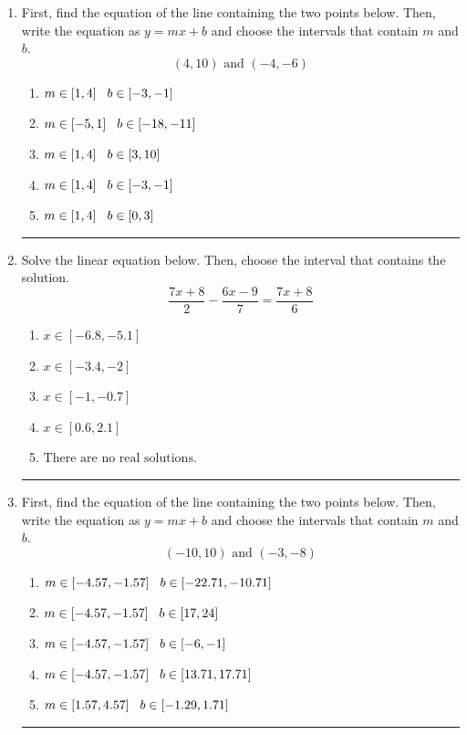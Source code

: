 \documentclass[14pt]{extbook}
\newcommand{\litem}[1]{\item#1\hspace*{-1cm}\rule{\textwidth}{0.4pt}}
\begin{document}
\begin{enumerate}
\litem{
First, find the equation of the line containing the two points below. Then, write the equation as $ y=mx+b $ and choose the intervals that contain $m$ and $b$.\[ (4, 10) \text{ and } (-4, -6) \]\begin{enumerate}[label=\Alph*.]
\item \( m \in [1, 4] \hspace*{3mm} b \in [-3, -1] \)
\item \( m \in [-5, 1] \hspace*{3mm} b \in [-18, -11] \)
\item \( m \in [1, 4] \hspace*{3mm} b \in [3, 10] \)
\item \( m \in [1, 4] \hspace*{3mm} b \in [-3, -1] \)
\item \( m \in [1, 4] \hspace*{3mm} b \in [0, 3] \)

\end{enumerate} }
\litem{
Solve the linear equation below. Then, choose the interval that contains the solution.\[ \frac{7x + 8}{2} - \frac{6x -9}{7} = \frac{7x + 8}{6} \]\begin{enumerate}[label=\Alph*.]
\item \( x \in [-6.8, -5.1] \)
\item \( x \in [-3.4, -2] \)
\item \( x \in [-1, -0.7] \)
\item \( x \in [0.6, 2.1] \)
\item \( \text{There are no real solutions.} \)

\end{enumerate} }
\litem{
First, find the equation of the line containing the two points below. Then, write the equation as $ y=mx+b $ and choose the intervals that contain $m$ and $b$.\[ (-10, 10) \text{ and } (-3, -8) \]\begin{enumerate}[label=\Alph*.]
\item \( m \in [-4.57, -1.57] \hspace*{3mm} b \in [-22.71, -10.71] \)
\item \( m \in [-4.57, -1.57] \hspace*{3mm} b \in [17, 24] \)
\item \( m \in [-4.57, -1.57] \hspace*{3mm} b \in [-6, -1] \)
\item \( m \in [-4.57, -1.57] \hspace*{3mm} b \in [13.71, 17.71] \)
\item \( m \in [1.57, 4.57] \hspace*{3mm} b \in [-1.29, 1.71] \)


\end{enumerate}}
\end{enumerate}
\end{document}

